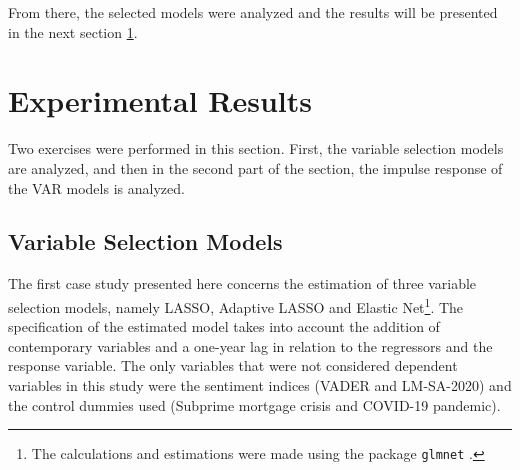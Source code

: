 From there, the selected models were analyzed and the results will be presented in the next  section  \ref{sec:expresults}.

\section{Experimental Results} \label{sec:expresults}

Two exercises were performed in this section. First, the variable selection models are analyzed, and then in the second part of the section, the impulse response of the VAR models is analyzed.\\

\subsection{Variable Selection Models}

The first case study presented here concerns the estimation of three variable selection models, namely LASSO, Adaptive LASSO and Elastic Net\footnote{The calculations and estimations were made using the package \texttt{glmnet} \cite[] {glmnet2011noah}.}. The specification of the estimated model takes into account the addition of contemporary variables and a one-year lag in relation to the regressors and the response variable. The only variables that were not considered dependent variables in this study were the sentiment indices (VADER and LM-SA-2020) and the control dummies used (Subprime mortgage crisis and COVID-19 pandemic).\\





